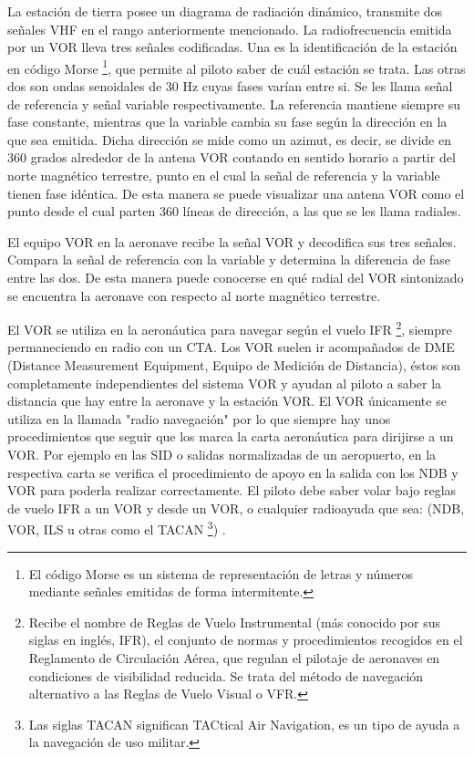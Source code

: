 La estaci\'on de tierra posee un diagrama de radiaci\'on din\'amico, transmite dos se\~nales VHF en el rango anteriormente mencionado. La radiofrecuencia emitida por un VOR lleva tres se\~nales codificadas. Una es la identificaci\'on de la estaci\'on en c\'odigo Morse \footnote{El c\'odigo Morse es un sistema de representaci\'on de letras y n\'umeros mediante se\~nales emitidas de forma intermitente.}, que permite al piloto saber de cu\'al estaci\'on se trata. Las otras dos son ondas senoidales de 30 Hz cuyas fases var\'ian entre si. Se les llama se\~nal de referencia y se\~nal variable respectivamente. La referencia mantiene siempre su fase constante, mientras que la variable cambia su fase seg\'un la direcci\'on en la que sea emitida. Dicha direcci\'on se mide como un azimut, es decir, se divide en 360 grados alrededor de la antena VOR contando en sentido horario a partir del norte magn\'etico terrestre, punto en el cual la se\~nal de referencia y la variable tienen fase id\'entica. De esta manera se puede visualizar una antena VOR como el punto desde el cual parten 360 l\'ineas de direcci\'on, a las que se les llama radiales.

El equipo VOR en la aeronave recibe la se\~nal VOR y decodifica sus tres se\~nales. Compara la se\~nal de referencia con la variable y determina la diferencia de fase entre las dos. De esta manera puede conocerse en qu\'e radial del VOR sintonizado se encuentra la aeronave con respecto al norte magn\'etico terrestre.

El VOR se utiliza en la aeron\'autica para navegar seg\'un el vuelo IFR \footnote{Recibe el nombre de Reglas de Vuelo Instrumental (m\'as conocido por sus siglas en ingl\'es, IFR), el conjunto de normas y procedimientos recogidos en el Reglamento de Circulaci\'on A\'erea, que regulan el pilotaje de aeronaves en condiciones de visibilidad reducida. Se trata del m\'etodo de navegaci\'on alternativo a las Reglas de Vuelo Visual o VFR.}, siempre permaneciendo en radio con un CTA. Los VOR suelen ir acompa\~nados de DME (Distance Measurement Equipment, Equipo de Medici\'on de Distancia), \'estos son completamente independientes del sistema VOR y ayudan al piloto a saber la distancia que hay entre la aeronave y la estaci\'on VOR. El VOR \'unicamente se utiliza en la llamada "radio navegaci\'on" por lo que siempre hay unos procedimientos que seguir que los marca la carta aeron\'autica para dirijirse a un VOR. Por ejemplo en las SID o salidas normalizadas de un aeropuerto, en la respectiva carta se verifica el procedimiento de apoyo en la salida con los NDB y VOR para poderla realizar correctamente. El piloto debe saber volar bajo reglas de vuelo IFR a un VOR y desde un VOR, o cualquier radioayuda que sea: (NDB, VOR, ILS u otras como el TACAN \footnote{Las siglas TACAN significan  TACtical Air Navigation,  es un tipo de ayuda a la navegaci\'on de uso militar.}) \cite{VOR-Wikipedia}.

